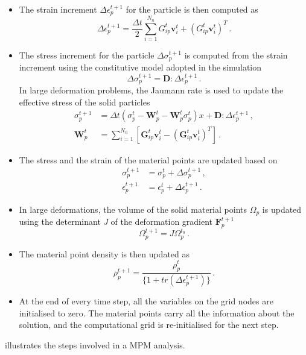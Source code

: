 \begin{itemize}
\item
The strain increment $\Delta \epsilon_{p}^{t+1}$ for the particle is then 
computed as
%
\begin{equation}
\Delta \epsilon_{p}^{t+1} = \frac{\Delta t}{2} 
\sum\limits_{\mathit{i}=1}^{\mathit{N}_{n}}{{G}_{\mathit{ip}}^{t} 
\mathbf{v}_{\mathit{i}}^{t} + ({G}_{\mathit{ip}}^{t} 
\mathbf{v}_{\mathit{i}}^{t})^{\mathit{T}}} \,.
\end{equation}
\item
The stress increment for the particle $\Delta \sigma_{\mathit{p}}^{t+1}$ is 
computed from the strain increment using the constitutive model adopted in the 
simulation
%
\begin{equation}
\Delta \sigma_{\mathit{p}}^{t+1} = \mathbf{D} : \Delta \epsilon_{p}^{t+1} \,.
\end{equation}
%
In large deformation problems, the Jaumann rate is used to update the effective 
stress of the solid particles
\begin{align}
\sigma_p^{t+1} & = \Delta t \left( \sigma_p^t - \mathbf{W}_p^t - 
\mathbf{W}_p^t \sigma_p^t\right) x+ 
\mathbf{D} : \Delta \epsilon_{p}^{t+1} \,, \\
\mathbf{W}_p^t & = \sum\limits_{i = 1}^{N_n}\left[ \mathbf{G}_{ip}^t 
\textbf{v}_i^t -  \left(\mathbf{G}_{ip}^t \textbf{v}_i^t\right)^T\right]  \,.
\end{align}
\item
The stress and the strain of the material points are updated based on
%
\begin{align}
\nonumber
\sigma_{\mathit{p}}^{t+1} & = \sigma_{\mathit{p}}^{t} + \Delta 
\sigma_{\mathit{p}}^{t+1} \,, \\
\epsilon_{p}^{t+1} & =\epsilon_{p}^{t} + \Delta \epsilon_{p}^{t+1} \,.
\end{align}
%

\item
In large deformations, the volume of the solid material points $\Omega_p$ is 
updated using the determinant \textit{J} of the deformation gradient 
$\mathbf{F}_p^{t+1}$
\begin{equation}
\Omega_p^{t+1} = J \Omega_p^{t_0} \,.
\end{equation}

\item
The material point density is then updated as
%
\begin{equation}
\rho_{p}^{t+1}=\frac{\rho_{p}^{t}}{\{1+tr(\Delta \epsilon_{p}^{t+1})\}} \,.
\end{equation}
%

\item
At the end of every time step, all the variables on the grid nodes are 
initialised to zero. The material points carry all the information about the
solution, and the computational grid is re-initialised for the next step.
\end{itemize}
 illustrates the steps involved in a MPM analysis. 

